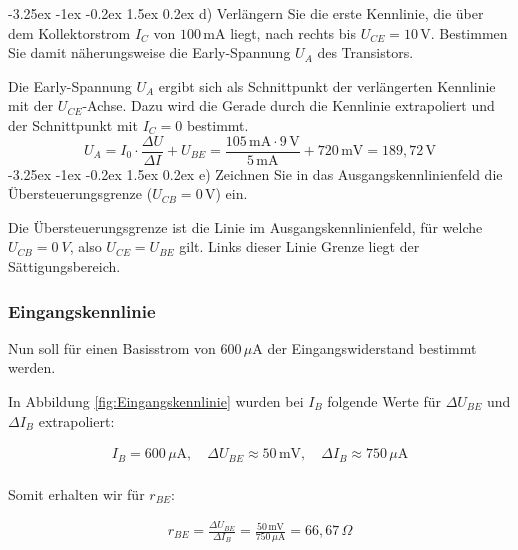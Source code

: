 \documentclass[
	a4paper, %
	12pt, %
]{CSUniSchoolLabReport}
\makeatletter
\renewcommand\paragraph{\@startsection{paragraph}{4}{\z@}%
  {-3.25ex \@plus -1ex \@minus -0.2ex}%
  {1.5ex \@plus 0.2ex}%
  {\normalfont\normalsize\bfseries}}
\makeatother
\begin{document}
\paragraph{d) Verlängern Sie die erste Kennlinie, die über dem Kollektorstrom $I_C$ von $100\,\mathrm{mA}$ liegt, nach rechts bis $U_{CE} = 10\,\mathrm{V}$. Bestimmen Sie damit näherungsweise die Early-Spannung $U_A$ des Transistors.}

Die Early-Spannung $U_A$ ergibt sich als Schnittpunkt der verlängerten Kennlinie mit der $U_{CE}$-Achse. Dazu wird die Gerade durch die Kennlinie extrapoliert und der Schnittpunkt mit $I_C = 0$ bestimmt.
\[
U_A = I_0 \cdot \frac{\Delta U}{\Delta I} + U_{BE}= \frac{105\,\mathrm{mA} \cdot 9\,\mathrm{V}}{5\,\mathrm{mA}} + 720\,\mathrm{mV}= 189{,}72\,\mathrm{V}
\]
\paragraph{e) Zeichnen Sie in das Ausgangskennlinienfeld die Übersteuerungsgrenze ($U_{CB} = 0\,\mathrm{V}$) ein.}

Die Übersteuerungsgrenze ist die Linie im Ausgangskennlinienfeld, für welche $U_{CB} = \SI{0}{V}$, also $U_{CE} = U_{BE}$ gilt. Links dieser Linie Grenze liegt der Sättigungsbereich.


\subsubsection{Eingangskennlinie}

Nun soll für einen Basisstrom von $600\,\mu\text{A}$ der Eingangswiderstand bestimmt werden.



In Abbildung \ref{fig:Eingangskennlinie} wurden bei $I_{B}$ folgende Werte für $\Delta U_{BE}$ und $\Delta I_B$ extrapoliert:

\[
\begin{aligned}
I_B = 600\,\mu\text{A}, \quad \Delta U_{BE} \approx 50\,\text{mV}, \quad \Delta I_B \approx 750\,\mu\text{A} \\
\end{aligned}
\]

\vspace{1em}

Somit erhalten wir für $r_{BE}$:

\[
\begin{aligned}
r_{BE} = \frac{\Delta U_{BE}}{\Delta I_B} = \frac{50\,\text{mV}}{750\,\mu\text{A}} = 66{,}67\,\Omega
\end{aligned}
\]
\end{document}
